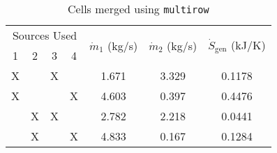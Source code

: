 \begin{table}[H]
\begin{center}

\caption{\small Cells merged 
using \texttt{multirow}}

\vspace{5mm}

\begin{tabular}{ccccccc}

\toprule

\multicolumn{4}{c}{Sources Used} 
& \multirow{2}{*}{$\dot{m}_1$ (kg/s)} 
& \multirow{2}{*}{$\dot{m}_2$ (kg/s)} 
& \multirow{2}{*}{$\dot{S}_{\text{gen}}$ (kJ/K)} \\

1 & 2 & 3 & 4 &&& \\

\midrule

X&&X&& 1.671 & 3.329 & 0.1178 \\
X&&&X& 4.603 & 0.397 & 0.4476 \\
&X&X&& 2.782 & 2.218 & 0.0441 \\
&X&&X& 4.833 & 0.167 & 0.1284 \\

\bottomrule

\end{tabular}
\end{center}
\end{table}